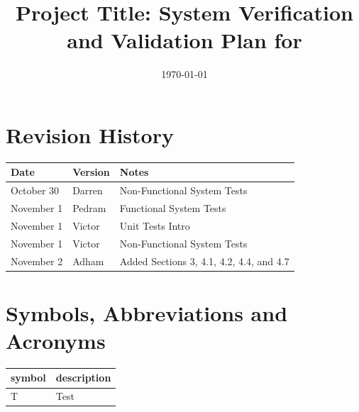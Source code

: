 \documentclass[12pt, titlepage]{article}
\begin{document}
\title{Project Title: System Verification and Validation Plan for \progname{}} 
\author{\authname}
\date{\today}
	
\maketitle


\section{Revision History}

\begin{tabularx}{\textwidth}{p{3cm}p{2cm}X}
\toprule {\bf Date} & {\bf Version} & {\bf Notes}\\
\midrule
October 30 & Darren & Non-Functional System Tests\\
November 1 & Pedram & Functional System Tests\\
November 1 & Victor & Unit Tests Intro\\
November 1 & Victor & Non-Functional System Tests\\
November 2 & Adham & Added Sections 3, 4.1, 4.2, 4.4, and 4.7\\
\bottomrule
\end{tabularx}

\newpage

\tableofcontents

\listoftables
{}

\listoffigures
{}

\newpage

\section{Symbols, Abbreviations and Acronyms}

\renewcommand{\arraystretch}{1.2}
\begin{tabular}{l l} 
  \toprule		
  \textbf{symbol} & \textbf{description}\\
  \midrule 
  T & Test\\
  \bottomrule
\end{tabular}\\


\newpage
\end{document}
